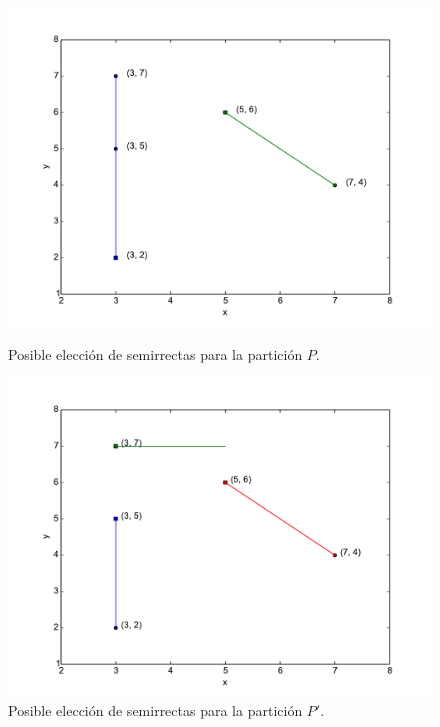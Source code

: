 \begin{figure}[H]
\centering
\begin{minipage}{0.49\textwidth}
  \centering
    \includegraphics[width=1\textwidth]{img/ejemplos/ej3-1.pdf}
  \caption{\footnotesize Posible elección de semirrectas para la partición $P$.}
  \label{fig:ej3-1}
\end{minipage}%
\hspace{0.01\textwidth}
\begin{minipage}{0.49\textwidth}   
  \centering
    \includegraphics[width=1\textwidth]{img/ejemplos/ej3-2.pdf} 
  \caption{\footnotesize Posible elección de semirrectas para la partición $P'$.}
  \label{fig:ej3-2}
\end{minipage}%
\end{figure}

